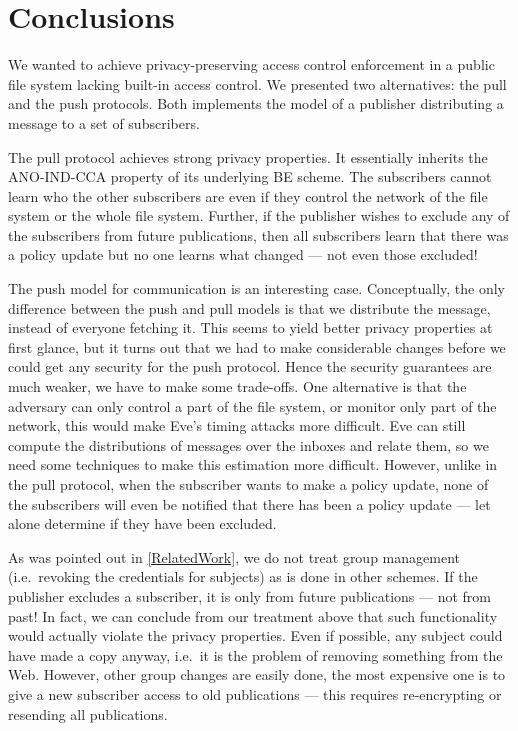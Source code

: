 \section{Conclusions}\label{Conclusions}

We wanted to achieve privacy-preserving access control enforcement in a public 
file system lacking built-in access control.
We presented two alternatives: the pull and the push protocols.
Both implements the model of a publisher distributing a message to a set of 
subscribers.

The pull protocol achieves strong privacy properties.
It essentially inherits the ANO-IND-CCA property of its underlying \ac{BE} 
scheme.
The subscribers cannot learn who the other subscribers are even if they control 
the network of the file system or the whole file system.
Further, if the publisher wishes to exclude any of the subscribers from future 
publications, then all subscribers learn that there was a policy update but no 
one learns what changed --- not even those excluded!

The push model for communication is an interesting case.
Conceptually, the only difference between the push and pull models is that we 
distribute the message, instead of everyone fetching it.
This seems to yield better privacy properties at first glance, but it turns out
that we had to make considerable changes before we could get any security for 
the push protocol.
Hence the security guarantees are much weaker, we have to make some trade-offs.
One alternative is that the adversary can only control a part of the file 
system, or monitor only part of the network, this would make Eve's timing 
attacks more difficult.
Eve can still compute the distributions of messages over the inboxes and relate 
them, so we need some techniques to make this estimation more difficult.
However, unlike in the pull protocol, when the subscriber wants to make 
a policy update, none of the subscribers will even be notified that there has 
been a policy update --- let alone determine if they have been excluded.

As was pointed out in \cref{RelatedWork}, we do not treat group management 
(i.e.\ revoking the credentials for subjects) as is done in other schemes.
If the publisher excludes a subscriber, it is only from future publications ---
not from past!
In fact, we can conclude from our treatment above that such functionality would 
actually violate the privacy properties.
Even if possible, any subject could have made a copy anyway, i.e.\ it is the 
problem of removing something from the Web.
However, other group changes are easily done, the most expensive one is to give
a new subscriber access to old publications --- this requires re-encrypting or 
resending all publications.

